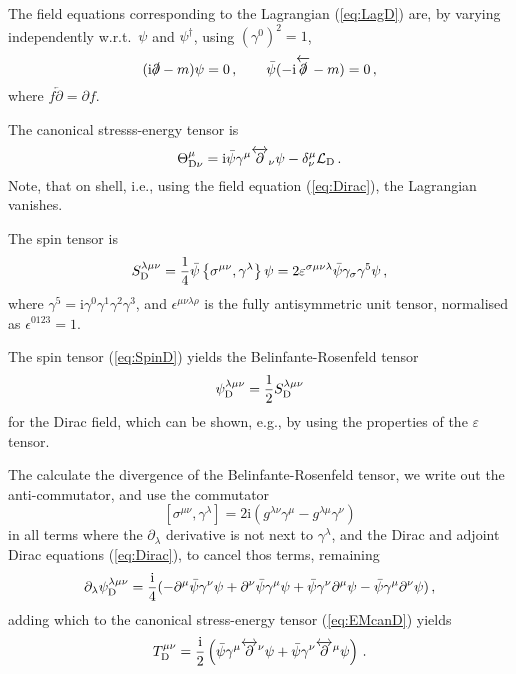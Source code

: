 \documentclass[a4paper,12pt]{article}
\def\imagi{\mathrm{i}}
\def\lag{{\mathcal{L}}}
\begin{document}
The field equations corresponding to the Lagrangian (\ref{eq:LagD}) are, by varying independently w.r.t.\ $\psi$ and $\psi^\dagger$, using $(\gamma^0)^2=1$,
\begin{equation}\label{eq:Dirac}
 (\imagi\slashed{\partial}-m)\psi=0\,,\quad\quad \bar{\psi}(-\imagi\overleftarrow{\slashed{\partial}}-m)=0\,,
\end{equation}
where $f\overleftarrow\partial=\partial f$.

The canonical stresss-energy tensor is
\begin{equation}\label{eq:EMcanD}
\Theta^\mu_{{\rm D}\nu}= \imagi \bar{\psi} \gamma^\mu \overleftrightarrow{\partial}_\nu\psi -\delta^\mu_\nu \lag_{\rm D}\,.
 \end{equation}
Note, that on shell, i.e., using the field equation (\ref{eq:Dirac}), the Lagrangian vanishes.
 
The spin tensor is
\begin{equation}\label{eq:SpinD}
 S^{\lambda\mu\nu}_{\rm D} = \frac{1}{4}\bar{\psi}\left\{\sigma^{\mu\nu},\gamma^\lambda\right\}\psi = 2\varepsilon^{\sigma\mu\nu\lambda}\bar{\psi}\gamma_\sigma \gamma^5\psi\,,
\end{equation}
where $\gamma^5=\imagi \gamma^0\gamma^1\gamma^2\gamma^3$, and $\epsilon^{\mu\nu\lambda\rho}$ is the fully antisymmetric unit tensor, normalised as $\epsilon^{0123}=1$.

The spin tensor (\ref{eq:SpinD}) yields the Belinfante-Rosenfeld tensor
\begin{equation}\label{eq:BRsolD}
 \psi^{\lambda\mu\nu}_{\rm D} = \frac{1}{2}S^{\lambda\mu\nu}_{\rm D}
\end{equation}
for the Dirac field, which can be shown, e.g., by using the properties of the $\varepsilon$ tensor.

The calculate the divergence of the Belinfante-Rosenfeld tensor, we write out the anti-commutator, and use the commutator
\[
\left[ \sigma^{\mu\nu},\gamma^\lambda \right] = 2\imagi\left( g^{\lambda\nu}\gamma^\mu - g^{\lambda\mu}\gamma^{\nu}\right)
\]
in all terms where the $\partial_\lambda$ derivative is not next to $\gamma^\lambda$, and the Dirac and adjoint Dirac equations (\ref{eq:Dirac}), to cancel thos terms, remaining
\[
 \partial_\lambda \psi^{\lambda\mu\nu}_{\rm D} = \frac{\imagi}{4}(-\partial^\mu \bar{\psi} \gamma^\nu \psi + \partial^\nu \bar{\psi}\gamma^\mu\psi + \bar{\psi}\gamma^\nu \partial^\mu \psi -  \bar{\psi}\gamma^\mu \partial^\nu \psi)\,,
\]
adding which to the canonical stress-energy tensor (\ref{eq:EMcanD}) yields
\begin{equation}\label{eq:SymmD}
 T^{\mu\nu}_{\rm D} = \frac{\imagi}{2}\left( \bar{\psi} \gamma^\mu \overleftrightarrow{\partial}{}^\nu \psi + \bar{\psi} \gamma^\nu \overleftrightarrow{\partial}{}^\mu \psi\right)\,.
\end{equation}
\end{document}
